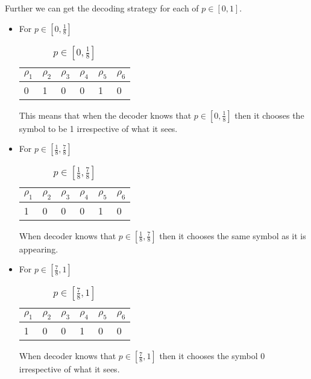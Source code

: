 \documentclass{article}
\begin{document}
Further we can get the decoding strategy for each of $p \in [0,1]$.
\begin{itemize}
\item For $p \in [0, \frac{1}{8}]$
  \begin{table}[H]
    \centering
    \caption{$p \in [0, \frac{1}{8}]$}
    \label{t:2}
    \begin{tabular}{|l|l|l|l|l|l|}
      \hline
      $\rho_1$ & $\rho_2$ & $\rho_3$ & $\rho_4$ & $\rho_5$ & $\rho_6$ \\ \hline
      0        & 1        & 0        & 0        & 1        & 0        \\ \hline
    \end{tabular}
  \end{table}
  This means that when the decoder knows that $p \in [0, \frac{1}{8}]$ then it chooses the symbol to be 1 irrespective of what it sees.
\item For $p \in [\frac{1}{8}, \frac{7}{8}]$
  \begin{table}[H]
    \centering
    \caption{$p \in [\frac{1}{8}, \frac{7}{8}]$}
    \label{t:3}
    \begin{tabular}{|l|l|l|l|l|l|}
      \hline
      $\rho_1$ & $\rho_2$ & $\rho_3$ & $\rho_4$ & $\rho_5$ & $\rho_6$ \\ \hline
      1        & 0        & 0        & 0        & 1        & 0        \\ \hline
    \end{tabular}
  \end{table}
  When decoder knows that $p \in [\frac{1}{8}, \frac{7}{8}]$ then it chooses the same symbol as it is appearing.
\item For $p \in [\frac{7}{8}, 1]$
  \begin{table}[H]
    \centering
    \caption{$p \in [\frac{7}{8}, 1]$}
    \label{t:4}
    \begin{tabular}{|l|l|l|l|l|l|}
      \hline
      $\rho_1$ & $\rho_2$ & $\rho_3$ & $\rho_4$ & $\rho_5$ & $\rho_6$ \\ \hline
      1        & 0        & 0        & 1        & 0        & 0        \\ \hline
    \end{tabular}
  \end{table}
  When decoder knows that $p \in [\frac{7}{8}, 1]$ then it chooses the symbol 0 irrespective of what it sees.
\end{itemize}
\end{document}

